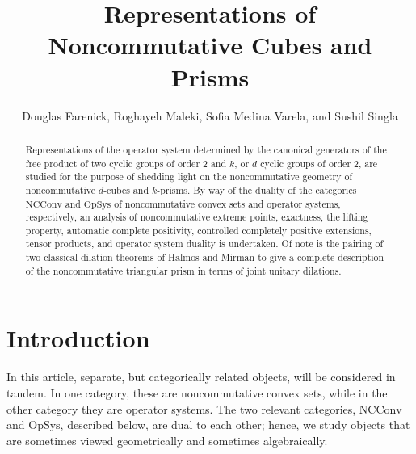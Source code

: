 \documentclass{amsart}
\theoremstyle{definition}
\theoremstyle{remark}
\numberwithin{equation}{section}
\begin{document}
\title[Representations of Noncommutative Cubes and Prisms]{Representations of Noncommutative Cubes and Prisms}

\author[D.~Farenick, R.~Maleki, S.~Medina Varela, S.~Singla]{Douglas Farenick, Roghayeh Maleki, Sofia Medina Varela, and Sushil Singla}
\address{Department of Mathematics and Statistics, University of Regina, Regina, Saskatchewan S4S 0A2, Canada}

 



\begin{abstract}
Representations of the operator system
determined by the canonical generators of the free product of two cyclic groups of order $2$ and $k$, or $d$ cyclic groups
of order $2$, are studied for the purpose of shedding light on the noncommutative geometry of
noncommutative $d$-cubes and $k$-prisms. By way of the duality of the categories ${\textrm{NCConv}}$ and ${\textrm{OpSys}}$
of noncommutative convex sets and operator systems, respectively, an analysis of noncommutative extreme points,
exactness, the lifting property, 
automatic complete positivity, controlled completely positive extensions, tensor products, and operator system duality is undertaken.
Of note is the pairing of two classical dilation theorems of Halmos and Mirman   
to give a complete description of the
noncommutative triangular prism in terms of joint unitary dilations.
\end{abstract}

\maketitle


 \section{Introduction}
 
 
In this article, separate, but categorically related objects, will be considered in tandem. In one category, these are noncommutative convex sets, while in the other category they are operator systems. The two relevant categories, ${\textrm{NCConv}}$ and ${\textrm{OpSys}}$, described below, are dual to each other; hence, we study objects that are sometimes viewed geometrically and sometimes algebraically. 
\end{document}
